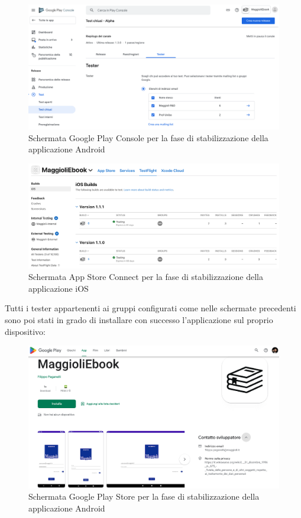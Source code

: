 \begin{figure}[H]
    \centering
    \includegraphics[width=1\textwidth]{img/google-play-console-maggioliebook.png}
    \caption{Schermata Google Play Console per la fase di stabilizzazione della applicazione Android}
    \label{google-play-console-maggioliebook}
\end{figure}

\begin{figure}[H]
    \centering
    \includegraphics[width=1\textwidth]{img/app-store-connect-maggioliebook.png}
    \caption{Schermata App Store Connect per la fase di stabilizzazione della applicazione iOS}
    \label{app-store-connect-maggioliebook}
\end{figure}

Tutti i tester appartenenti ai gruppi configurati come nelle schermate precedenti sono poi stati in grado di installare con successo l'applicazione sul proprio dispositivo:

\begin{figure}[H]
    \centering
    \includegraphics[width=1\textwidth]{img/google-play-store-maggioliebook.png}
    \caption{Schermata Google Play Store per la fase di stabilizzazione della applicazione Android}
    \label{google-play-store-maggioliebook}
\end{figure}

